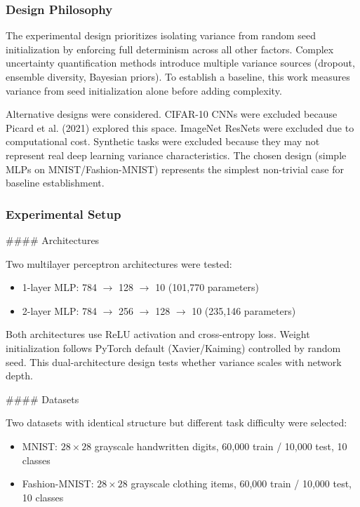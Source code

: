 
\subsubsection{Design Philosophy}

The experimental design prioritizes isolating variance from random seed initialization by enforcing full determinism across all other factors. Complex uncertainty quantification methods introduce multiple variance sources (dropout, ensemble diversity, Bayesian priors). To establish a baseline, this work measures variance from seed initialization alone before adding complexity.

Alternative designs were considered. CIFAR-10 CNNs were excluded because Picard et al. (2021) explored this space. ImageNet ResNets were excluded due to computational cost. Synthetic tasks were excluded because they may not represent real deep learning variance characteristics. The chosen design (simple MLPs on MNIST/Fashion-MNIST) represents the simplest non-trivial case for baseline establishment.

\subsubsection{Experimental Setup}

\#\#\#\# Architectures

Two multilayer perceptron architectures were tested:

\begin{itemize}
\item 1-layer MLP: 784 $\rightarrow$ 128 $\rightarrow$ 10 (101,770 parameters)
\item 2-layer MLP: 784 $\rightarrow$ 256 $\rightarrow$ 128 $\rightarrow$ 10 (235,146 parameters)
\end{itemize}

Both architectures use ReLU activation and cross-entropy loss. Weight initialization follows PyTorch default (Xavier/Kaiming) controlled by random seed. This dual-architecture design tests whether variance scales with network depth.

\#\#\#\# Datasets

Two datasets with identical structure but different task difficulty were selected:

\begin{itemize}
\item MNIST: $28\times 28$ grayscale handwritten digits, 60,000 train / 10,000 test, 10 classes
\item Fashion-MNIST: $28\times 28$ grayscale clothing items, 60,000 train / 10,000 test, 10 classes
\end{itemize}


